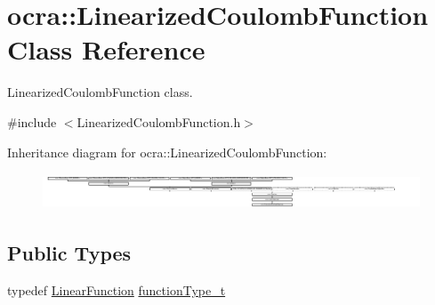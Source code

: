 \hypertarget{classocra_1_1LinearizedCoulombFunction}{}\section{ocra\+:\+:Linearized\+Coulomb\+Function Class Reference}
\label{classocra_1_1LinearizedCoulombFunction}


Linearized\+Coulomb\+Function class.  




{\ttfamily \#include $<$Linearized\+Coulomb\+Function.\+h$>$}

Inheritance diagram for ocra\+:\+:Linearized\+Coulomb\+Function\+:\begin{figure}[H]
\begin{center}
\leavevmode
\includegraphics[height=1.082126cm]{d0/dd6/classocra_1_1LinearizedCoulombFunction}
\end{center}
\end{figure}
\subsection*{Public Types}
\begin{DoxyCompactItemize}
\item 
typedef \hyperlink{classocra_1_1LinearFunction}{Linear\+Function} \hyperlink{classocra_1_1LinearizedCoulombFunction_a3b8f1d487a59ea860aee65223cc7c6aa}{function\+Type\+\_\+t}
\end{DoxyCompactItemize}
